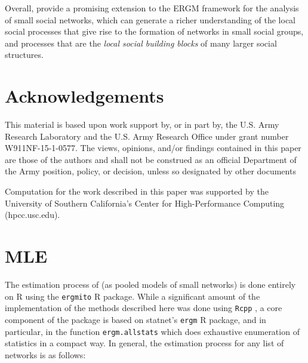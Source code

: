\documentclass[12pt]{article}
\begin{document}
Overall,  \ergmitos{} provide a promising extension to the ERGM framework for the analysis of small social networks, which can generate a richer understanding of the local social processes that give rise to the formation of networks in small social groups, and processes that are the \textit{local social building blocks} of many larger social structures. 

\section{Acknowledgements}

This material is based upon work support by, or in part by, the U.S. Army Research Laboratory and the U.S. Army Research Office under grant number W911NF-15-1-0577. The views, opinions, and/or findings contained in this paper are those of the authors and shall not be construed as an official Department of the Army position, policy, or decision, unless so designated by other documents

Computation for the work described in this paper was supported by the University of Southern California’s Center for High-Performance Computing (hpcc.usc.edu).

\clearpage


\nocite{VegaYon2019,R,butts2016,Wickham2016,Leifeld2013}


\clearpage

\appendix

\section{MLE\label{appendix:mle}}

The estimation process of \ergmitos{} (as pooled models of small networks) is done entirely on R using the \texttt{ergmito} R package. While a significant amount of the implementation of the methods described here was done using \texttt{Rcpp} \cite{Eddelbuettel2011}, a core component of the package is based on statnet's \texttt{ergm} R package, and in particular, in the function \texttt{ergm.allstats} which does exhaustive enumeration of statistics in a compact way. In general, the estimation process for any list of networks is as follows:
\end{document}
